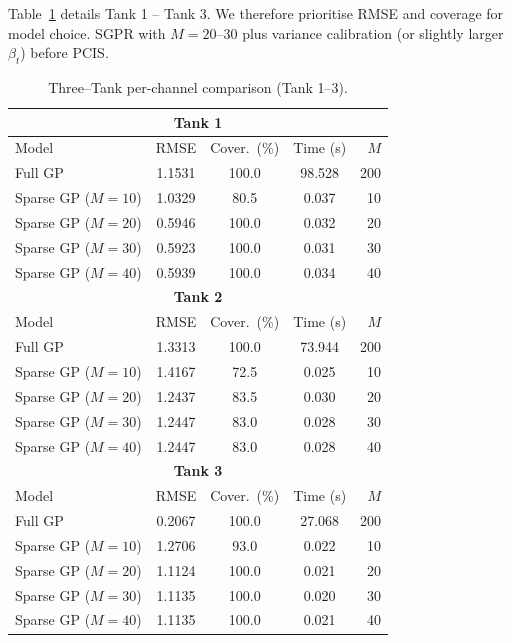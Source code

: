 \documentclass[10pt]{article}
\newcommand{\1}{\mathbbm{1}}
\begin{document}
Table~\ref{tab:wt_sgpr_perres} details Tank 1 – Tank 3. We therefore prioritise RMSE and coverage for model choice. SGPR with $M{=}20$–$30$ plus variance calibration (or slightly larger $\beta_t$) before PCIS.

\begin{table}[ht]
\centering
\caption{Three–Tank per-channel comparison (Tank 1–3).}
\label{tab:wt_sgpr_perres}
\setlength{\tabcolsep}{3pt}
\begin{tabular}{lcccr}
\toprule
\multicolumn{5}{c}{\textbf{Tank 1}}\\
\midrule
Model & RMSE & Cover.\ (\%) & Time (s) & $M$\\
\midrule
Full GP              & 1.1531 & 100.0 & 98.528 & 200\\
Sparse GP ($M{=}10$) & 1.0329 & 80.5  & 0.037  & 10\\
Sparse GP ($M{=}20$) & 0.5946 & 100.0 & 0.032  & 20\\
Sparse GP ($M{=}30$) & 0.5923 & 100.0 & 0.031  & 30\\
Sparse GP ($M{=}40$) & 0.5939 & 100.0 & 0.034  & 40\\
\midrule
\multicolumn{5}{c}{\textbf{Tank 2}}\\
\midrule
Model & RMSE & Cover.\ (\%) & Time (s) & $M$\\
\midrule
Full GP              & 1.3313 & 100.0 & 73.944 & 200\\
Sparse GP ($M{=}10$) & 1.4167 & 72.5  & 0.025  & 10\\
Sparse GP ($M{=}20$) & 1.2437 & 83.5  & 0.030  & 20\\
Sparse GP ($M{=}30$) & 1.2447 & 83.0  & 0.028  & 30\\
Sparse GP ($M{=}40$) & 1.2447 & 83.0  & 0.028  & 40\\
\midrule
\multicolumn{5}{c}{\textbf{Tank 3}}\\
\midrule
Model & RMSE & Cover.\ (\%) & Time (s) & $M$\\
\midrule
Full GP              & 0.2067 & 100.0 & 27.068 & 200\\
Sparse GP ($M{=}10$) & 1.2706 & 93.0  & 0.022  & 10\\
Sparse GP ($M{=}20$) & 1.1124 & 100.0 & 0.021  & 20\\
Sparse GP ($M{=}30$) & 1.1135 & 100.0 & 0.020  & 30\\
Sparse GP ($M{=}40$) & 1.1135 & 100.0 & 0.021  & 40\\
\bottomrule
\end{tabular}
\end{table}
\end{document}
